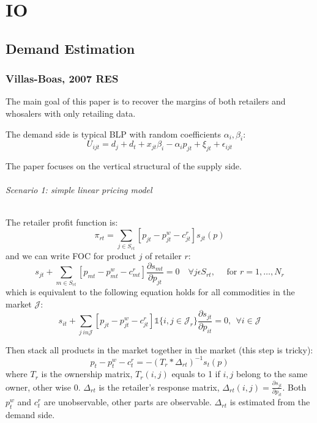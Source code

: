 




\part{IO} %
\label{prt:io}


\chapter{Demand Estimation} %
\label{cha:demand_estimation}

\section{Villas-Boas, 2007 RES} %
\label{sec:villas_boas_2007_res}

\textbf{}

The main goal of this paper is to recover the margins of both retailers and whosalers with only retailing data.

The demand side is typical BLP with random coefficients $\alpha_i, \beta_i$:
\[
    U_{i j t}=d_{j}+d_{t}+x_{j t} \beta_{i}-\alpha_{i} p_{j t}+\xi_{j t}+\epsilon_{i j t} \tag{1}
\]

The paper focuses on the vertical structural of the supply side.

\paragraph{Scenario 1: simple linear pricing model}

The retailer profit function is:
\[
    \pi_{r t}=\sum_{j \in S_{r t}}\left[p_{j t}-p_{j t}^{w}-c_{j t}^{r}\right] s_{j t}(p)
\]
and we can write FOC for product $j$ of retailer $r$:
\[
    s_{j t}+\sum_{m \in S_{r t}}\left[p_{m t}-p_{m t}^{w}-c_{m t}^{r}\right] \frac{\partial s_{m t}}{\partial p_{j t}}=0 \quad \forall j \epsilon S_{r t}, \quad \text { for } r=1, \ldots, N_{r}
    \tag{5}
\]
which is equivalent to the following equation holds for all commodities in the market $\mathcal J$:
\[
    s_{it} + \sum_{j \ in \mathcal J} [p_{jt} - p^w_{jt} - c^r_{jt}] \mathds 1\{i,j \in \mathcal J_r\} \frac{\partial s_{jt}}{ \partial p_{it}} = 0,\ \  \forall i \in \mathcal J
\]

Then stack all products in the market together in the market (this step is tricky):
\[
    p_{t}-p_{t}^{w}-c_{t}^{r}=-\left(T_{r} * \Delta_{r t}\right)^{-1} s_{t}(p)
\]
where $T_r$ is the ownership matrix, $T_r(i,j)$ equals to 1 if $i,j$ belong to the same owner, other wise 0. 
$\Delta_{rt}$ is the retailer's response matrix, $\Delta_{rt}(i,j)= \frac{\partial s_{jt}}{\partial p_{it}}$.
Both $p^w_t$ and $c^r_t$ are unobservable, other parts are observable. 
$\Delta_{rt}$ is estimated from the demand side.

